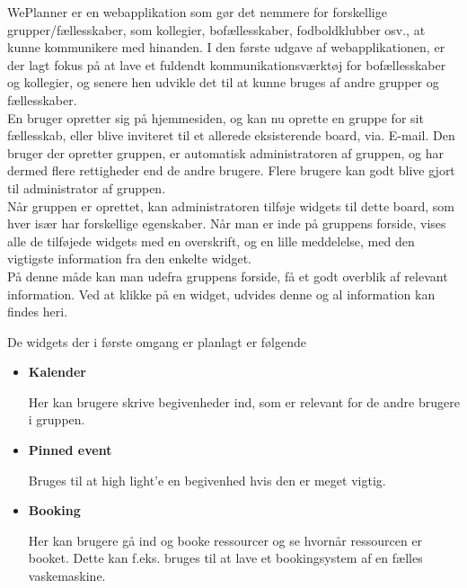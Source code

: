 \noindent WePlanner er en webapplikation som gør det nemmere for forskellige grupper/fællesskaber, som kollegier, bofællesskaber, fodboldklubber osv., at kunne kommunikere med hinanden. I den første udgave af webapplikationen, er der lagt fokus på at lave et fuldendt kommunikationsværktøj for bofællesskaber og kollegier, og senere hen udvikle det til at kunne bruges af andre grupper og fællesskaber.\\

\noindent En bruger opretter sig på hjemmesiden, og kan nu oprette en gruppe for sit fællesskab, eller blive inviteret til et allerede eksisterende board, via. E-mail. Den bruger der opretter gruppen, er automatisk administratoren af gruppen, og har dermed flere rettigheder end de andre brugere. Flere brugere kan godt blive gjort til administrator af gruppen. \\

\noindent Når gruppen er oprettet, kan administratoren tilføje widgets til dette board, som hver især har forskellige egenskaber. Når man er inde på gruppens forside, vises alle de tilføjede widgets med en overskrift, og en lille meddelelse, med den vigtigste information fra den enkelte widget.\\
På denne måde kan man udefra gruppens forside, få et godt overblik af relevant information. Ved at klikke på en widget, udvides denne og al information kan findes heri.

\noindent De widgets der i første omgang er planlagt er følgende

\begin{itemize}
\item  \textbf{Kalender}

Her kan brugere skrive begivenheder ind, som er relevant for de andre brugere i gruppen.
\end{itemize}

\begin{itemize}
\item  \textbf{Pinned event}

Bruges til at high light'e en begivenhed hvis den er meget vigtig.
\end{itemize}

\begin{itemize}
\item  \textbf{Booking}

Her kan brugere gå ind og booke ressourcer og se hvornår ressourcen er booket. Dette kan f.eks. bruges til at lave et bookingsystem af en fælles vaskemaskine.
\end{itemize}

